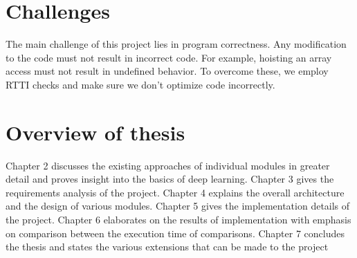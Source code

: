 \section{Challenges}

The main challenge of this project lies in program correctness. Any modification to the code must not result in incorrect code. For example, hoisting an array access must not result in undefined behavior. To overcome these, we employ RTTI checks and make sure we don't optimize code incorrectly.

\section{Overview of thesis}
Chapter 2 discusses the existing approaches of individual modules in greater detail and proves insight into the basics of deep learning. Chapter 3 gives the requirements analysis of the project. Chapter 4 explains the overall architecture and the design of various modules. Chapter 5 gives the implementation details of the project. Chapter 6 elaborates on the results of implementation with emphasis on comparison between the execution time of comparisons. Chapter 7 concludes the thesis and states the various extensions that can be made to the project
